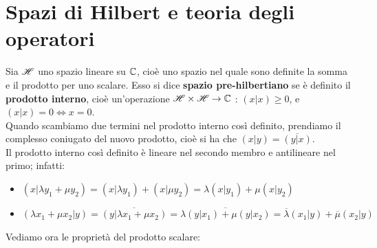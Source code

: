 \chapter{Spazi di Hilbert e teoria degli operatori}

Sia $\mathscr{H}$ uno spazio lineare su $\mathbb{C}$, cioè uno spazio nel quale sono definite la somma e il prodotto per uno scalare. Esso si dice \textbf{spazio pre-hilbertiano} se è definito  il \textbf{prodotto interno}, cioè un'operazione $\mathscr{H} \times \mathscr{H} \to \mathbb{C}$ : $(x|x) \geq 0$, e $(x|x) =0 \iff x=0$.\\Quando scambiamo due termini nel prodotto interno così definito, prendiamo il complesso coniugato del nuovo prodotto, cioè si ha che $(x|y)=\overline{(y|x)}$.
\\
Il prodotto interno così definito è lineare nel secondo membro e antilineare nel primo; infatti:

\begin{itemize}
\item $(x|\lambda y_1 + \mu y_2)=(x|\lambda y_1) + (x|\mu y_2) =\lambda (x|y_1) + \mu (x|y_2)$
\item $(\lambda x_1+\mu x_2|y)=\overline{(y|\lambda x_1 + \mu x_2)}=\overline{\lambda (y|x_1)+ \mu (y|x_2)} = \overline{\lambda} (x_1|y) + \overline{\mu} (x_2|y)$
\end{itemize} Vediamo ora le proprietà del prodotto scalare:

